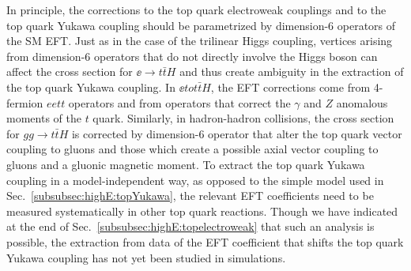 In principle, the corrections to the top quark electroweak couplings
and to the top quark Yukawa coupling should be parametrized by
dimension-6 operators of the SM EFT.   Just as in the case of the
trilinear Higgs coupling, vertices arising from dimension-6 operators
that do not directly involve the Higgs boson can affect the cross
section for $\ee\to t\bar t H$ and thus create ambiguity in the
extraction of the top quark Yukawa coupling.   In $\ee to t\bar t H$,
the EFT corrections come from 4-fermion $eett$ operators and from
operators that correct the $\gamma$ and $Z$ anomalous moments of the
$t$ quark.   Similarly, in hadron-hadron collisions, the cross section
for $gg\to t\bar t H$ is corrected by dimension-6 operator that alter
the top quark vector coupling to gluons and those which create a
possible axial vector coupling to gluons and a gluonic magnetic
moment.  To extract the top quark Yukawa coupling in a
model-independent way, as opposed to the simple model used in
Sec.~\ref{subsubsec:highE:topYukawa}, the relevant EFT coefficients
need to be measured systematically in other top quark reactions.
Though we have indicated at the end of
Sec.~\ref{subsubsec:highE:topelectroweak} that such an analysis is
possible, the extraction from data of the EFT coefficient that shifts
the top quark Yukawa coupling has not yet been studied in simulations.